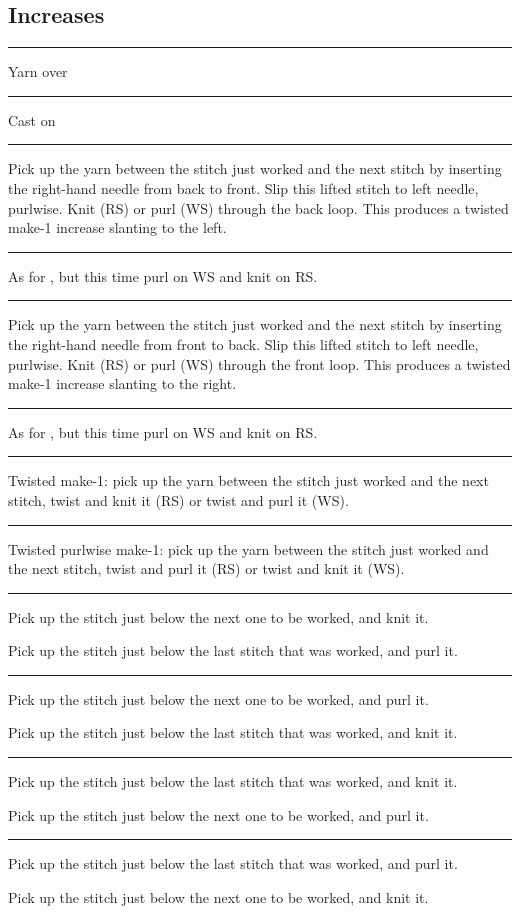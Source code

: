 \documentclass{article}
\newif \ifdesigner
\newlength{\symbolcolwidth}
\newlength{\singlecolwidth}
\newlength{\doublecolwidth}
\newcommand{\setcolwidths}[1]{
	\setlength{\symbolcolwidth}{#1}
	\addtolength{\symbolcolwidth}{1pt}
	\setlength{\doublecolwidth}{\textwidth}
	\addtolength{\doublecolwidth}{-4\tabcolsep}
	\addtolength{\doublecolwidth}{-1.2pt} %
	\addtolength{\doublecolwidth}{-\symbolcolwidth}
	\setlength{\singlecolwidth}{0.5\doublecolwidth}
	\addtolength{\singlecolwidth}{-1\tabcolsep}
	\addtolength{\singlecolwidth}{-0.2pt} %
	}
\newcommand\keyrow[3]{\par\allowbreak\hrule\par\nopagebreak\noindent
	\vrule\hfill 
	\begin{minipage}{\symbolcolwidth}\centering#1\end{minipage}%
	\hfill\vrule\hfill
	\begin{minipage}{\singlecolwidth}
		\raisebox{1pt}{\strut}#2\raisebox{-1pt}{\strut}\end{minipage}%
	\hfill\vrule\hfill
	\begin{minipage}{\singlecolwidth}
		\raisebox{1pt}{\strut}#3\raisebox{-1pt}{\strut}\end{minipage}%
	\hfill\vrule
	\par\nointerlineskip}
\newcommand\dblkeyrow[2]{\par\allowbreak\hrule\par\nopagebreak\noindent
	\vrule\hfill
	\begin{minipage}{\symbolcolwidth}\centering#1\end{minipage}%
	\hfill\vrule\hfill
	\begin{minipage}{\doublecolwidth}
		\raisebox{1pt}{\strut}#2\raisebox{-1pt}{\strut}\end{minipage}%
	\hfill\vrule
	\par\nointerlineskip}
\begin{document}
\begin{fullpages}
\fi

\clearpage

\section{Increases}

\ifdesigner Some charts work better if a double increase \textknit{W} takes up three squares instead of one. In the grid font, the best-looking way to do this is to use \verb|\mainpass|: {\verb|\mainpass[\purlbox{}{3}]{``W``}| \knitgrid \textknit{\mainpass[\purlbox{}{3}]{``W``}}}.

\medskip

\fi

\setcolwidths{\stitchwd}
\dblkeyrow{}{Yarn over}
\dblkeyrow{}{Cast on}
\dblkeyrow{}{Pick up the yarn between the stitch just worked and the next stitch by inserting the right-hand needle from back to front. Slip this lifted stitch to left needle, purlwise. Knit (RS) or purl (WS) through the back loop. This produces a twisted make-1 increase slanting to the left.}
\dblkeyrow{}{As for , but this time purl on WS and knit on RS.}
\dblkeyrow{}{Pick up the yarn between the stitch just worked and the next stitch by inserting the right-hand needle from front to back. Slip this lifted stitch to left needle, purlwise. Knit (RS) or purl (WS) through the front loop. This produces a twisted make-1 increase slanting to the right.}
\dblkeyrow{}{As for , but this time purl on WS and knit on RS.}
\dblkeyrow{}{Twisted make-1: pick up the yarn between the stitch just worked and the next stitch, twist and knit it (RS) or twist and purl it (WS).}
\dblkeyrow{}{Twisted purlwise make-1: pick up the yarn between the stitch just worked and the next stitch, twist and purl it (RS) or twist and knit it (WS).}
\keyrow{}{Pick up the stitch just below the next one to be worked, and knit it.}{Pick up the stitch just below the last stitch that was worked, and purl it.}
\keyrow{}{Pick up the stitch just below the next one to be worked, and purl it.}{Pick up the stitch just below the last stitch that was worked, and knit it.}
\keyrow{}{Pick up the stitch just below the last stitch that was worked, and knit it.}{Pick up the stitch just below the next one to be worked, and purl it.}
\keyrow{}{Pick up the stitch just below the last stitch that was worked, and purl it.}{Pick up the stitch just below the next one to be worked, and knit it.}

\end{fullpages}
\end{document}
